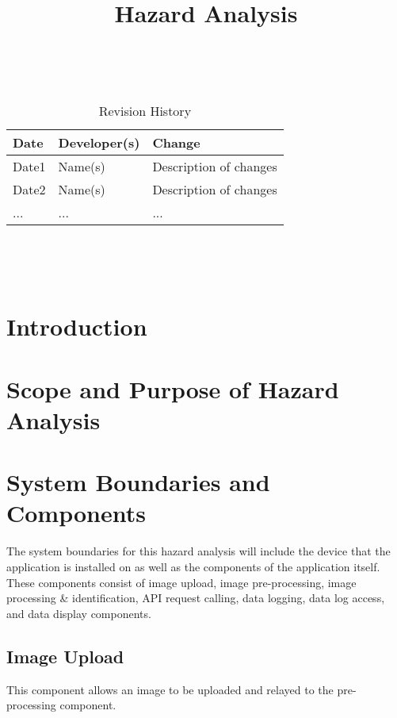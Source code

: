 \documentclass{article}
\title{Hazard Analysis\\\progname}
\author{\authname}
\date{}
\begin{document}
	
	\maketitle
	\thispagestyle{empty}
	
	~\newpage
	
	
	\begin{table}[hp]
		\caption{Revision History} \label{TblRevisionHistory}
		\begin{tabularx}{\textwidth}{llX}
			\toprule
			\textbf{Date} & \textbf{Developer(s)} & \textbf{Change}\\
			\midrule
			Date1 & Name(s) & Description of changes\\
			Date2 & Name(s) & Description of changes\\
			... & ... & ...\\
			\bottomrule
		\end{tabularx}
	\end{table}
	
	~\newpage
	
	\tableofcontents
	
	~\newpage
	
	
	
	\section{Introduction}
	
	
	\section{Scope and Purpose of Hazard Analysis}
	
	\section{System Boundaries and Components}
	The system boundaries for this hazard analysis will include the device that the application is installed on as well as the components of the application itself. These components consist of image upload, image pre-processing, image processing & identification, API request calling, data logging, data log access, and data display components.
	
	\subsection{Image Upload}
	This component allows an image to be uploaded and relayed to the pre-processing component.
\end{document}
